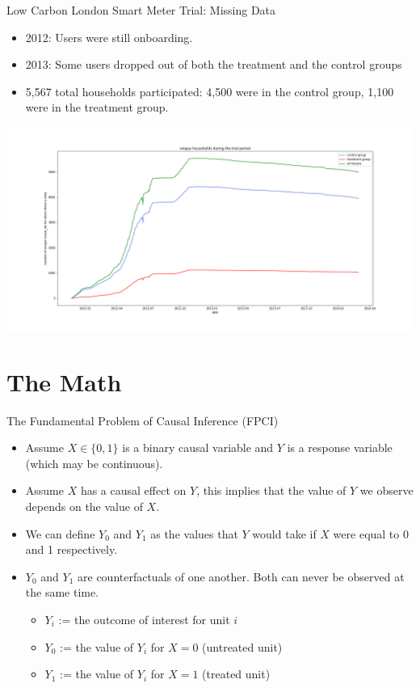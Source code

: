 \documentclass{beamer}
\begin{document}
\begin{frame}{Low Carbon London Smart Meter Trial: Missing Data}
  \begin{itemize}
    \item 2012: Users were still onboarding.
    \item 2013: Some users dropped out of both the treatment and the control groups
    \item 5,567 total households participated: 4,500 were in the control group, 1,100 were in the treatment group.
  \end{itemize}
  \vspace{-0.5cm}
  \includegraphics[width=1\textwidth]{images/house-count.png}
\end{frame}

\section{The Math}

\begin{frame}{The Fundamental Problem of Causal Inference (FPCI)}
  \begin{itemize}
    \item<+-> Assume $X \in\{0,1\}$ is a binary causal variable and $Y$ is a response variable (which may be continuous).
    \item<+-> Assume $X$ has a causal effect on $Y$, this implies that the value of $Y$ we observe depends on the value of $X$.
    \item<+-> We can define $Y_0$ and $Y_1$ as the values that $Y$ would take if $X$ were equal to 0 and 1 respectively.
    \item<+-> $Y_0$ and $Y_1$ are counterfactuals of one another. Both can never be observed at the same time.
    \begin{itemize}
      \item $Y_i$ := the outcome of interest for unit $i$
      \item $Y_0$ := the value of $Y_i$ for $X=0$ (untreated unit)
      \item $Y_1$ := the value of $Y_i$ for $X=1$ (treated unit)
    \end{itemize}
  \end{itemize}
\end{frame}
\end{document}
